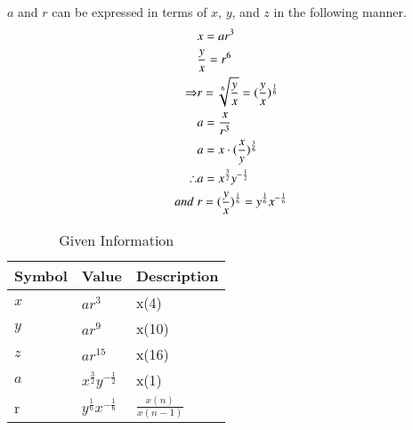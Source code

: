 \documentclass[journal,12pt,twocolumn]{IEEEtran}
\theoremstyle{remark}
\begin{document}
$a$ and $r$ can be expressed in terms of $x$, $y$, and $z$ in the following manner.
\begin{align}
\notag      &x=ar^3 \\
\notag    &\frac{y}{x}=r^6 \\
    \Rightarrow&r=\sqrt[6]{\frac{y}{x}}=(\frac{y}{x})^{\frac{1}{6}}\\
\notag    &a=\frac{x}{r^3}\\
\notag    &a=x\cdot(\frac{x}{y})^{\frac{3}{6}}\\
    \therefore &a=x^{\frac{3}{2}}y^{-\frac{1}{2}} \\
    and\; &r=(\frac{y}{x})^{\frac{1}{6}}= y^{\frac{1}{6}}x^{-\frac{1}{6}}
\end{align}

\begin{table}
    \centering
        \caption{Given Information}
    \begin{tabular}{|m{2cm}|m{2cm}|m{2cm}|}
    \hline
    \textbf{Symbol} & \textbf{Value} & \textbf{Description}\\ [1ex]
    \hline
        $x$ & $ar^3$ & x(4) \\ [1ex]
    \hline
        $y$ & $ar^9$ & x(10)\\ [1ex]
    \hline
        $z$ & $ar^{15}$ & x(16)\\ [1ex]
    \hline
        $a$ & $x^{\frac{3}{2}}y^{-\frac{1}{2}}$ & x(1) \\[1ex]
    \hline
        r & $y^{\frac{1}{6}}x^{-\frac{1}{6}}$ & $\frac{x(n)}{x(n-1)}$\\[1ex]
    \hline
    \end{tabular}
\end{table}
\end{document}

